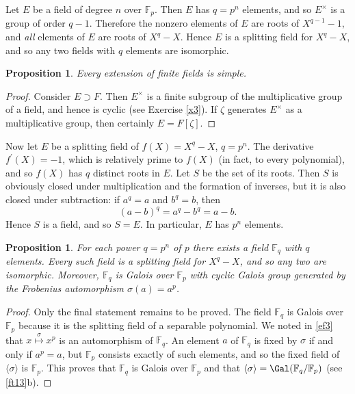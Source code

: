 \documentclass[a4paper,11pt,final,openany]{memoir}
\newtheorem{proposition}[X]{Proposition}
\theoremstyle{nonumberplain}
\newtheorem{proof}{Proof.}
\begin{document}
Let $E$ be a field of degree $n$ over $\mathbb{F}_{p}$. Then $E$ has $q=p^{n}$
elements, and so $E^{\times}$ is a group of order $q-1$. Therefore the nonzero
elements of $E$ are roots of $X^{q-1}-1$, and \textit{all} elements of $E$ are
roots of $X^{q}-X$. Hence $E$ is a splitting field for $X^{q}-X$, and so any
two fields with $q$ elements are isomorphic.

\begin{proposition}
\label{cg17}Every extension of finite fields is simple.
\end{proposition}

\begin{proof}
Consider $E\supset F$. Then $E^{\times}$ is a finite subgroup of the
multiplicative group of a field, and hence is cyclic (see Exercise \ref{x3}).
If $\zeta$ generates $E^{\times}$ as a multiplicative group, then certainly
$E=F[\zeta]$.
\end{proof}

Now let $E$ be a splitting field of $f(X)=X^{q}-X$, $q=p^{n}$. The derivative
$f^{\prime}(X)=-1$, which is relatively prime to $f(X)$ (in fact, to every
polynomial), and so $f(X)$ has $q$ distinct roots in $E$. Let $S$ be the set
of its roots. Then $S$ is obviously closed under multiplication and the
formation of inverses, but it is also closed under subtraction: if $a^{q}=a$
and $b^{q}=b$, then
\[
(a-b)^{q}=a^{q}-b^{q}=a-b.
\]
Hence $S$ is a field, and so $S=E$. In particular, $E$ has $p^{n}$ elements.

\begin{proposition}
\label{cg15}For each power $q=p^{n}$ of $p$ there exists a field
$\mathbb{F}_{q}$ with $q$ elements. Every such field is a splitting field for
$X^{q}-X$, and so any two are isomorphic. Moreover, $\mathbb{F}_{q}$ is Galois
over $\mathbb{F}_{p}$ with cyclic Galois group generated by the Frobenius
automorphism $\sigma(a)=a^{p}$.
\end{proposition}

\begin{proof}
Only the final statement remains to be proved. The field $\mathbb{F}_{q}$ is
Galois over $\mathbb{F}_{p}$ because it is the splitting field of a separable
polynomial. We noted in \ref{ef3} that $x\overset{\sigma}{\mapsto}x^{p}$ is an
automorphism of $\mathbb{F}_{q}$. An element $a$ of $\mathbb{F}_{q}$ is fixed
by $\sigma$ if and only if $a^{p}=a$, but $\mathbb{F}_{p}$ consists exactly of
such elements, and so the fixed field of $\langle{}\sigma\rangle$ is
$\mathbb{F}_{p}$. This proves that $\mathbb{F}_{q}$ is Galois over
$\mathbb{F}_{p}$ and that $\langle{}\sigma\rangle=\Gal(\mathbb{F}%
_{q}/\mathbb{F}_{p})$ (see \ref{ft13}b).
\end{proof}
\end{document}

